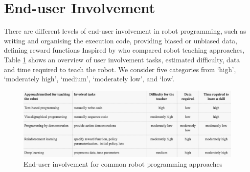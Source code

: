 



\section{End-user Involvement}\label{sssec:End-User Involvement}
There are different levels of end-user involvement in robot programming, such as writing and organising the execution code, providing biased or unbiased data, defining reward functions \etc 
Inspired by \cite{kormushev2013reinforcement} who compared robot teaching approaches,
Table \ref{tab:enduserinvolvement} shows an overview of user involvement tasks, estimated difficulty, data and time required to teach the robot.
We consider five categories from `high', `moderately high', `medium', `moderately low', and `low'.

\begin{figure}[ht]
	\centering
	\includegraphics[width=\linewidth]{figures/robot-programming-comparison}
	\caption{End-user involvement for common robot programming approaches}
	\label{tab:enduserinvolvement}
\end{figure}

